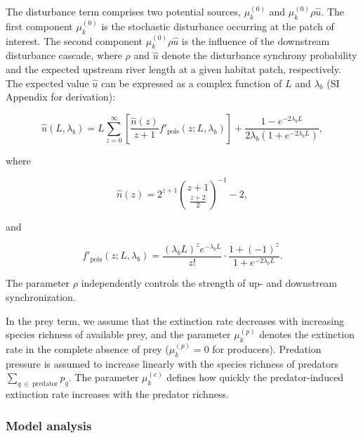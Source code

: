 \documentclass[11pt, class=article, crop=false]{standalone}
\begin{document}
The disturbance term comprises two potential sources, $\mu^{(0)}_k$ and $\mu^{(0)}_k \rho \hat{u}$.
The first component $\mu^{(0)}_k$ is the stochastic disturbance occurring at the patch of interest.
The second component $\mu^{(0)}_k \rho \hat{u}$ is the influence of the downstream disturbance cascade, where $\rho$ and $\hat{u}$ denote the disturbance synchrony probability and the expected upstream river length at a given habitat patch, respectively.
The expected value $\hat{u}$ can be expressed as a complex function of $L$ and $\lambda_b$ (SI Appendix for derivation):

\begin{equation}
    \hat{u}(L, \lambda_b) = L \sum_{z = 0}^{\infty} \left[ \frac{\hat{n}(z)}{z + 1} f'_{\text{pois}}(z; L, \lambda_b)\right] + \frac{1 - e^{-2 \lambda_b L}}{2 \lambda_b (1 + e^{-2 \lambda_b L})},
\end{equation}

where

\begin{equation}
    \hat{n}(z) = 2^{z + 1} \binom{z + 1}{\frac{z + 2}{2}}^{-1} - 2,
\end{equation}

and

\begin{equation}
    f'_{\text{pois}}(z; L, \lambda_b) = \frac{(\lambda_b L)^z e^{-\lambda_b L}}{z!} \cdot \frac{1 + (-1)^{z}}{1 + e^{-2\lambda_b L}}.
\end{equation}

The parameter $\rho$ independently controls the strength of up- and downstream synchronization.

In the prey term, we assume that the extinction rate decreases with increasing species richness of available prey, and the parameter $\mu_{k}^{(p)}$ denotes the extinction rate in the complete absence of prey ($\mu_{k}^{(p)} = 0$ for producers).
Predation pressure is assumed to increase linearly with the species richness of predators $\sum_{q~\in~\text{predator}} p_{q}$.
The parameter $\mu_{k}^{(c)}$ defines how quickly the predator-induced extinction rate increases with the predator richness.

\subsubsection{Model analysis}
\end{document}
